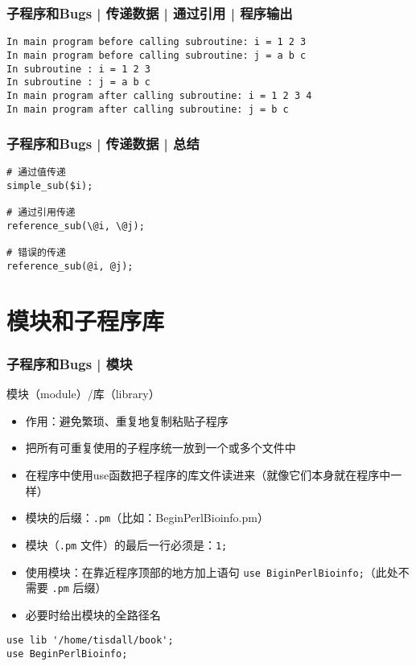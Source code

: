 \begin{frame}[fragile]
  \frametitle{子程序和Bugs | 传递数据 | 通过引用 | 程序输出}
\begin{lstlisting}
In main program before calling subroutine: i = 1 2 3
In main program before calling subroutine: j = a b c
In subroutine : i = 1 2 3
In subroutine : j = a b c
In main program after calling subroutine: i = 1 2 3 4
In main program after calling subroutine: j = b c
\end{lstlisting}
\end{frame}

\begin{frame}[fragile]
  \frametitle{子程序和Bugs | 传递数据 | \alert{总结}}
\begin{lstlisting}
# 通过值传递
simple_sub($i);

# 通过引用传递
reference_sub(\@i, \@j);

# 错误的传递
reference_sub(@i, @j);
\end{lstlisting}
\end{frame}

\section{模块和子程序库}
\begin{frame}[fragile]
  \frametitle{子程序和Bugs | \alert{模块}}
  \begin{block}{模块（module）/库（library）}
    \begin{itemize}
      \item 作用：避免繁琐、重复地复制粘贴子程序
      \item 把所有可重复使用的子程序统一放到一个或多个文件中
      \item 在程序中使用use函数把子程序的库文件读进来（就像它们本身就在程序中一样）
      \item 模块的后缀：\verb|.pm|（比如：BeginPerlBioinfo.pm）
      \item 模块（\verb|.pm| 文件）的最后一行必须是：\verb|1;|
      \item 使用模块：在靠近程序顶部的地方加上语句 \verb|use BiginPerlBioinfo;|（此处不需要 \verb|.pm| 后缀）
      \item 必要时给出模块的全路径名
    \end{itemize}
  \end{block}
\begin{lstlisting}
use lib '/home/tisdall/book';
use BeginPerlBioinfo;
\end{lstlisting}
\end{frame}

